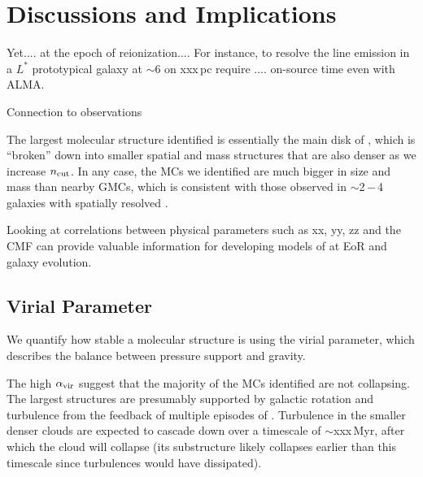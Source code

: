 \documentclass[apj]{emulateapj} %
\begin{document}
\section{Discussions and Implications}     \label{sec:diss}
Yet.... at the epoch of reionization.... For instance, to resolve the 
\aco line emission in a $L^*$ prototypical galaxy at \z$\sim$6 on xxx\,pc 
require .... on-source time even with ALMA. 

Connection to observations

The largest molecular structure identified is essentially the main disk of \flower, which is ``broken'' down into smaller 
spatial and mass structures that are also denser as we increase $n_{\rm cut}$. In any case,
the MCs we identified are much bigger in size and mass than nearby GMCs, which is consistent with 
those observed in \z$\sim$2\,$-$\,4 galaxies with spatially resolved \obs.

Looking at correlations between physical parameters such as xx, yy, zz and the CMF 
can provide valuable information for developing models of \SF at EoR and 
galaxy evolution.


\subsection{Virial Parameter}
We quantify how stable a molecular structure is using the virial parameter, which 
describes the balance between pressure support and gravity. 

The high $\alpha_{\rm vir}$ suggest that the majority of the MCs identified are not collapsing. 
The largest structures are presumably supported by galactic rotation and turbulence from the feedback of 
multiple episodes of \SF.
Turbulence in the smaller denser clouds are expected to cascade down over a timescale of $\sim$xxx\,Myr, after which the cloud will collapse 
(its substructure likely collapses earlier than this timescale since turbulences would have dissipated). 
\end{document}
